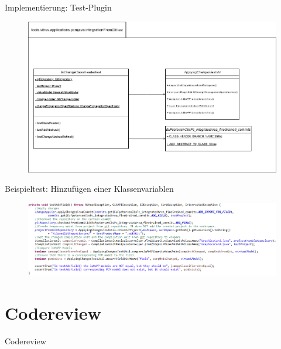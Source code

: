 \documentclass[18pt]{beamer}
\begin{document}
\begin{frame}{Implementierung: Test-Plugin}
\begin{figure}
\includegraphics[scale=0.28]{pictures/integrationFromGitTest_diagram.png}
\end{figure}
\end{frame}


\begin{frame}{Beispieltest: Hinzufügen einer Klassenvariablen}
\begin{figure}
\includegraphics[scale=0.4]{pictures/method_example.png}
\end{figure}
\end{frame}

\section{Codereview}
\begin{frame}{Codereview}
\end{frame}
\end{document}
